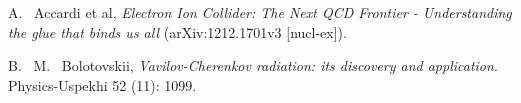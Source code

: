 \documentclass[12pt]{report}
\begin{document}
\begin{thebibliography}{99}


  A. ~Accardi et al, {\it Electron Ion Collider: The Next QCD Frontier - Understanding the glue that binds us all} (arXiv:1212.1701v3 [nucl-ex]).

 B. ~M. ~Bolotovskii, {\it Vavilov-Cherenkov radiation: its discovery and application}. Physics-Uspekhi 52 (11): 1099.


\end{thebibliography}


\appendix




\newpage


\vitapage
\end{document}
